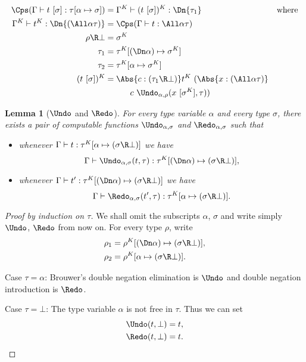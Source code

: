 \documentclass{amsart}
\newtheorem{lemma}[subsection]{Lemma}
\begin{document}
\begin{align*}
\Cps(\Gamma \vdash t~[\sigma] : \tau[\alpha\mapsto\sigma]) & =
  \Gamma^K \vdash (t~[\sigma])^K :
  \Dn{\tau_1}
  & \mbox{where}
  \\
\Gamma^K \vdash t^K : \Dn{(\All\alpha \tau)} & =
  \Cps(\Gamma \vdash t : \All\alpha \tau)
  \\
\rho \R \bot & = \sigma^K
  \\
\tau_1 & = \tau^K[(\Dn\alpha) \mapsto \sigma^K]
  \\
\tau_2 & = \tau^K[\alpha \mapsto \sigma^K]
  \\
(t~[\sigma])^K & =
  \Abs{c : (\tau_1 \R \bot)} t^K~(\Abs{x : (\All\alpha\tau)} \\
  &\INDENT
  c~\Undo_{\alpha,\rho}(x~[\sigma^K], \tau))
\end{align*}

\begin{lemma}
[$\Undo$ and $\Redo$]
\label{lem:undo-redo}
For every type variable $\alpha$ and every type $\sigma$, there
exists a pair of computable functions $\Undo_{\alpha,\sigma}$ and
$\Redo_{\alpha,\sigma}$ such that
\begin{itemize}
\item
whenever
$\Gamma \vdash t : \tau^K[\alpha \mapsto (\sigma\R\bot)]$
we have
\[
\Gamma \vdash \Undo_{\alpha,\sigma}(t,\tau) :
  \tau^K[(\Dn\alpha) \mapsto (\sigma\R\bot)],
\]
\item
whenever
$\Gamma \vdash t' : \tau^K[(\Dn\alpha) \mapsto (\sigma\R\bot)]$
we have
\[
\Gamma \vdash \Redo_{\alpha,\sigma}(t',\tau) :
  \tau^K[\alpha \mapsto (\sigma\R\bot)].
\]
\end{itemize}
\end{lemma}

\begin{proof}
[Proof by induction on $\tau$]
We shall omit the subscripts $\alpha$, $\sigma$ and write simply
$\Undo$, $\Redo$ from now on. For every type $\rho$, write
\begin{align*}
\rho_1 & = \rho^K[(\Dn\alpha)\mapsto(\sigma\R\bot)],\\
\rho_2 & = \rho^K[\alpha\mapsto(\sigma\R\bot)].
\end{align*}

Case $\tau = \alpha$: Brouwer's double negation elimination is
$\Undo$ and double negation introduction is $\Redo$.

Case $\tau = \bot$: The type variable $\alpha$ is not free in
$\tau$. Thus we can set
\begin{align*}
\Undo(t,\bot) & = t, \\
\Redo(t,\bot) & = t.
\end{align*}
\end{proof}
\end{document}
